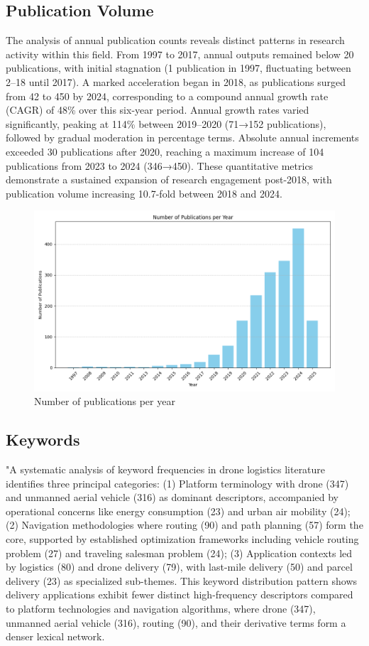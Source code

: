 \documentclass{article}
\begin{document}
\subsection{Publication Volume}
 The analysis of annual publication counts reveals distinct patterns in research activity within this field. From 1997 to 2017, annual outputs remained below 20 publications, with initial stagnation (1 publication in 1997, fluctuating between 2–18 until 2017). A marked acceleration began in 2018, as publications surged from 42 to 450 by 2024, corresponding to a compound annual growth rate (CAGR) of 48\% over this six-year period. Annual growth rates varied significantly, peaking at 114\% between 2019–2020 (71→152 publications), followed by gradual moderation in percentage terms. Absolute annual increments exceeded 30 publications after 2020, reaching a maximum increase of 104 publications from 2023 to 2024 (346→450). These quantitative metrics demonstrate a sustained expansion of research engagement post-2018, with publication volume increasing 10.7-fold between 2018 and 2024.

\begin{figure}[htbp]
  \centering
  \includegraphics[width=\textwidth, keepaspectratio]{images/Figure_1}
  \caption{Number of publications per year}
  \label{fig:Figure}
\end{figure}

\subsection{Keywords}
"A systematic analysis of keyword frequencies in drone logistics literature identifies three principal categories: (1) Platform terminology with drone (347) and unmanned aerial vehicle (316) as dominant descriptors, accompanied by operational concerns like energy consumption (23) and urban air mobility (24); (2) Navigation methodologies where routing (90) and path planning (57) form the core, supported by established optimization frameworks including vehicle routing problem (27) and traveling salesman problem (24); (3) Application contexts led by logistics (80) and drone delivery (79), with last-mile delivery (50) and parcel delivery (23) as specialized sub-themes. This keyword distribution pattern shows delivery applications exhibit fewer distinct high-frequency descriptors compared to platform technologies and navigation algorithms, where drone (347), unmanned aerial vehicle (316), routing (90), and their derivative terms form a denser lexical network.
\end{document}
